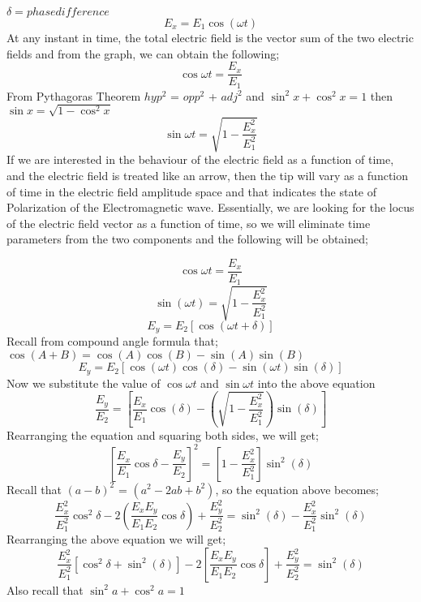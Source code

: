 $\delta   =phase  difference$\\

\begin{equation}
E_x = E_1 \cos(\omega t)
\end{equation}
At any instant in time, the total electric field is the vector sum of the two electric  fields and from the graph, we can obtain the following;
\begin{equation}
\cos {\omega t} = \frac {E_x}{E_1} 
\end{equation}
From Pythagoras Theorem $hyp^2$ = $opp^2$ + $adj^2$ and $\sin^2 x + \cos^2 x = 1$ then $\sin x = \sqrt{1-\cos^ 2x}$
\begin{equation}
\sin {\omega t} = \sqrt{1 - \frac{E_{x}^2}{E_{1}^2}}
\end{equation}
If we are interested in the behaviour of the electric field as a function of time, and the electric field is treated like an arrow, then the tip will vary as a function of time in the electric field amplitude space and that indicates the state of Polarization of the Electromagnetic wave. Essentially, we are looking for the locus of the electric field vector as a function of time, so we will eliminate time parameters from the two components and the following will be obtained;

\begin{equation}
\cos{\omega t} = \frac{E_x}{E_1}
\end{equation}
\begin{equation}
\sin (\omega t) = \sqrt{1-\frac{E_{x}^2}{E_{1}^2}}
\end{equation}
\begin{equation}
E_y = E_2 [\cos(\omega t + \delta)]
\end{equation}
Recall from compound angle formula that; $\cos(A+B) = \cos(A)\cos(B) - \sin(A)\sin(B)$ 
\begin{equation}
E_y = E_2 [\cos(\omega t)\cos(\delta) -\sin(\omega t) \sin(\delta)]
\end{equation}
Now we substitute the value of $\cos{\omega t}$ and $\sin{\omega t}$ into the above equation
\begin{equation}
\frac{E_y}{E_2} =[\frac{E_x}{E_1}\cos(\delta)-(\sqrt{1 - \frac{E_{x}^2}{E_{1}^2}})\sin(\delta)]
\end{equation}
Rearranging the equation and squaring both sides, we will get;
\begin{equation}
{[\frac{E_x}{E_1}\cos{\delta}-\frac{E_y}{E_2}]}^2 = [1-\frac{E_{x}^2}{E_{1}^2}]\sin^2(\delta)
\end{equation}
Recall that ${(a-b)}^2$ = $(a^2-2ab+b^2)$, so the equation above becomes;
\begin{dmath}
\frac{E_{x}^2}{E_{1}^2}\cos^2{\delta}-2(\frac{E_{x}E_{y}}{E_{1}E_{2}}\cos{\delta}) + \frac{E_{y}^2}{E_{2}^2} = \sin^2(\delta)-\frac{E_{x}^2}{E_{1}^2}\sin^2(\delta)
\end{dmath}
Rearranging the above equation we will get;
\begin{equation}
\frac{E_{x}^2}{E_{1}^2}[\cos^2{\delta} + \sin ^2(\delta)] - 2[\frac{E_{x}E_{y}}{E_{1}E_{2}}\cos{\delta}] + \frac{E_{y}^2}{E_{2}^2} = \sin^2(\delta)
\end{equation}
Also recall that $ \sin^2{a} + \cos^2{a} =  1$

